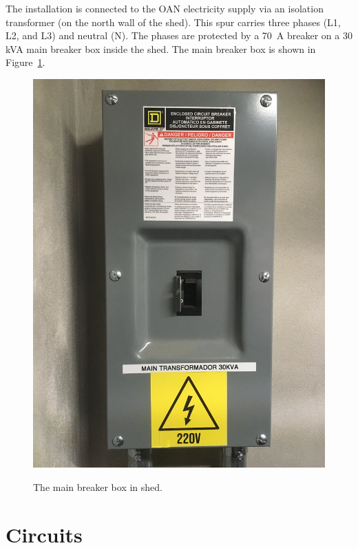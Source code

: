 \ifddoti
The {\projectname} installation is connected to the OAN electricity supply via an isolation transformer (on the north wall of the shed). This spur carries three phases (L1, L2, and L3) and neutral (N). The phases are protected by a 70~A breaker on a 30 kVA main breaker box inside the shed. The main breaker box is shown in Figure~\ref{figure:main-breaker-box}.

\begin{figure}[t]
\begin{center}
\begin{labeled}{\includegraphics[width=0.45\linewidth,angle=0]{figures/electrical-power-ddoti-main-breaker-box.jpg}}
\end{labeled}
\end{center}
\caption{The main breaker box in shed.}
\label{figure:main-breaker-box}
\end{figure}
\fi

\section{Circuits}

